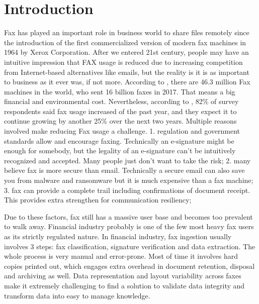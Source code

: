 \documentclass[sigconf]{acmart}
\begin{document}
%


%
\maketitle

\section{Introduction}
Fax has played an important role in business world to share files remotely since the introduction of the first commercialized version of modern fax machines in 1964 by Xerox Corporation. After we entered 21st century, people may have an intuitive impression that FAX usage is reduced due to increasing competition from Internet-based alternatives like emails, but the reality is it is as important to business as it ever was, if not more. According to \cite{couponchili2015faxfacts}, there are 46.3 million Fax machines in the world, who sent 16 billion faxes in 2017. That means a big financial and environmental cost. Nevertheless, according to \cite{idc2017faxusagewhitepaper}, 82\% of survey respondents said fax usage increased of the past year, and they expect it to continue growing by another 25\% over the next two years. Multiple reasons involved make reducing Fax usage a challenge.
1. regulation and government standards allow and encourage faxing. Technically an e-signature might be enough for somebody, but the legality of an e-signature can't be intuitively recognized and accepted. Many people just don't want to take the risk;
2. many believe fax is more secure than email. Technically a secure email can also save you from malware and ransomware but it is much expensive than a fax machine;
3. fax can provide a complete trail including confirmations of document receipt. This provides extra strengthen for communication resiliency;

Due to these factors, fax still has a massive user base and becomes too prevalent to walk away. Financial industry probably is one of the few most heavy fax users as its strictly regulated nature. In financial industry, fax ingestion usually involves 3 steps: fax classification, signature verification and data extraction. The whole process is very manual and error-prone. Most of time it involves hard copies printed out, which engages extra overhead in document retention, disposal and archiving as well. Data representation and layout variability across faxes make it extremely challenging to find a solution to validate data integrity and transform data into easy to manage knowledge.
\end{document}
